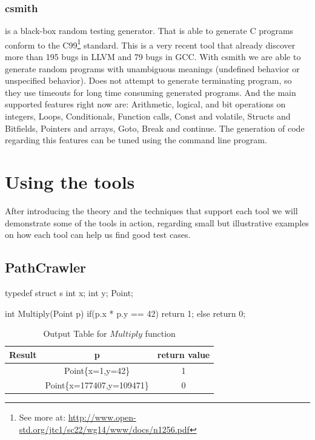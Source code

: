 \documentclass[10pt, conference, compsocconf]{IEEEtran}
\newcommand{\checkK}{\color{ForestGreen}\checkmark}
\begin{document}
\subsubsection{\textbf{csmith}\cite{Yang:2011:FUB:1993316.1993532}} is a black-box random testing generator. That is able to generate C programs
conform to the C99\footnote{See more at: \url{http://www.open-std.org/jtc1/sc22/wg14/www/docs/n1256.pdf}} standard. This is a very recent tool that already discover
more than 195 bugs in LLVM and 79 bugs in GCC. With csmith we are able to generate random programs with unambiguous meanings (undefined behavior or 
unspecified behavior). Does not attempt to generate terminating program, so they use timeouts for long time consuming generated programs.
And the main supported features right now are: Arithmetic, logical, and bit operations on integers, Loops, Conditionals, Function calls, Const and volatile,
Structs and Bitfields, Pointers and arrays, Goto, Break and continue. The generation of code regarding this features can be tuned using the command line program.

\section{Using the tools}
After introducing the theory and the techniques that support each tool we will demonstrate some of the tools in action, regarding small but illustrative examples
on how each tool can help us find good test cases.

\subsection{PathCrawler}
\begin{code}
typedef struct s {
    int x;
    int y;
}Point;

int Multiply(Point p) {
    if(p.x * p.y == 42) return 1;
    else return 0;
}
\end{code}

\begin{table}[!ht]
\renewcommand{\arraystretch}{1.3}
\setlength{\tabcolsep}{10pt}
\caption{Output Table for $Multiply$ function}
\label{tab:mul}
\centering
\noindent \begin{tabular}{|c|c|c|}\hline
Result & p & return value\\\hline
\checkK & Point\{x=1,y=42\} & 1 \\\hline
\checkK & Point\{x=177407,y=109471\} & 0 \\\hline
\end{tabular}
\end{table}
\end{document}
